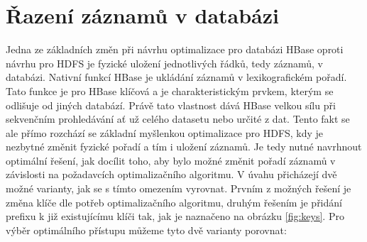 \documentclass[thesis=M,czech]{FITthesis}[2012/06/26]
\begin{document}
\section{Řazení záznamů v databázi}
Jedna ze základních změn při návrhu optimalizace pro databázi HBase oproti návrhu pro HDFS je fyzické uložení jednotlivých řádků, tedy záznamů, v databázi. Nativní funkcí HBase je ukládání záznamů v lexikografickém pořadí. Tato funkce je pro HBase klíčová a je charakteristickým prvkem, kterým se odlišuje od jiných databází. Právě tato vlastnost dává HBase velkou sílu při sekvenčním prohledávání ať už celého datasetu nebo určité  z dat. Tento fakt se ale přímo rozchází se základní myšlenkou optimalizace pro HDFS, kdy je nezbytné změnit fyzické pořadí a tím i uložení záznamů. 
Je tedy nutné navrhnout optimální řešení, jak docílit toho, aby bylo možné změnit pořadí záznamů v závislosti na požadavcích optimalizačního algoritmu. V úvahu přicházejí dvě možné varianty, jak se s tímto omezením vyrovnat. Prvním z možných řešení je změna klíče dle potřeb optimalizačního algoritmu, druhým řešením je přidání prefixu k již existujícímu klíči tak, jak je naznačeno na obrázku \ref{fig:keys}. Pro výběr optimálního přístupu můžeme tyto dvě varianty porovnat:
\end{document}
